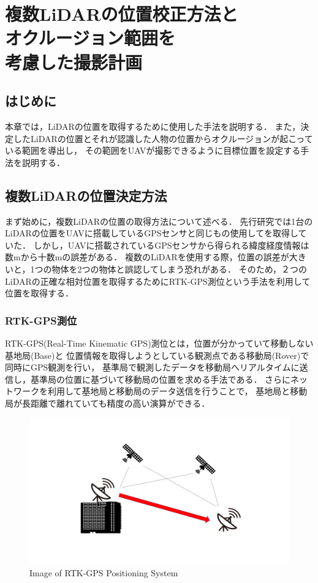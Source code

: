 \documentclass[autodetect-engine,dvipdfmx-if-dvi,ja=standard,a4j,jbase=11pt,magstyle=nomag*]{bxjsreport}
\begin{document}
\chapter[複数LiDARの位置校正方法とオクルージョン範囲を考慮した撮影計画]{複数LiDARの位置校正方法と\\オクルージョン範囲を\\考慮した撮影計画}
	
\section{はじめに}
本章では，LiDARの位置を取得するために使用した手法を説明する．
また，決定したLiDARの位置とそれが認識した人物の位置からオクルージョンが起こっている範囲を導出し，
その範囲をUAVが撮影できるように目標位置を設定する手法を説明する．

\section{複数LiDARの位置決定方法}
まず始めに，複数LiDARの位置の取得方法について述べる．
先行研究では1台のLiDARの位置をUAVに搭載しているGPSセンサと同じもの使用してを取得していた．
しかし，UAVに搭載されているGPSセンサから得られる緯度経度情報は数mから十数mの誤差がある．
複数のLiDARを使用する際，位置の誤差が大きいと，1つの物体を2つの物体と誤認してしまう恐れがある．
そのため，２つのLiDARの正確な相対位置を取得するためにRTK-GPS測位という手法を利用して位置を取得する．

\subsection{RTK-GPS測位}
RTK-GPS(Real-Time Kinematic GPS)測位とは，位置が分かっていて移動しない基地局(Base)と
位置情報を取得しようとしている観測点である移動局(Rover)で同時にGPS観測を行い，
基準局で観測したデータを移動局へリアルタイムに送信し，基準局の位置に基づいて移動局の位置を求める手法である．
さらにネットワークを利用して基地局と移動局のデータ送信を行うことで，
基地局と移動局が長距離で離れていても精度の高い演算ができる．

\begin{figure}[t]
    \centering
    \includegraphics[width=\linewidth, clip]{./figure/chapter3/RTK.png}
    \caption{Image of RTK-GPS Positioning System}
    \label{fig:RTK}
\end{figure}
\end{document}
